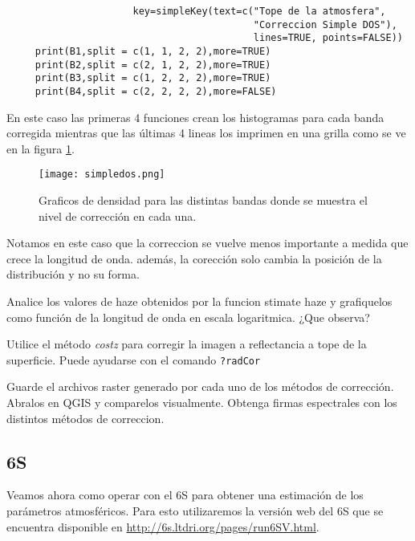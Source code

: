 \begin{exa}
\begin{lstlisting}
                      key=simpleKey(text=c("Tope de la atmosfera",
                                           "Correccion Simple DOS"),
                                           lines=TRUE, points=FALSE))
     print(B1,split = c(1, 1, 2, 2),more=TRUE)
     print(B2,split = c(2, 1, 2, 2),more=TRUE)
     print(B3,split = c(1, 2, 2, 2),more=TRUE)
     print(B4,split = c(2, 2, 2, 2),more=FALSE)
    \end{lstlisting}
    En este caso las primeras 4 funciones crean los histogramas para cada banda
    corregida mientras que las \'ultimas 4 lineas los imprimen en una grilla como
    se ve en la figura \ref{fig:simpledos}.
    \begin{figure}[h!]
    \begin{center}
        \texttt{[image: simpledos.png]}
    \end{center}
    \caption{Graficos de densidad para las distintas bandas donde se
        muestra el nivel de correcci\'on en cada una.}
    \label{fig:simpledos}
    \end{figure}
Notamos en este caso que la correccion se vuelve menos importante a medida
que crece la longitud de onda. adem\'as, la corecci\'on solo cambia la
posici\'on de la distribuci\'on y no su forma.

\end{exa}
\begin{act}
    Analice los valores de haze obtenidos por la funcion stimate haze y grafiquelos
    como funci\'on de la longitud de onda en escala logaritmica. ¿Que observa?
\end{act}

\begin{act}
    Utilice el m\'etodo \emph{costz} para corregir la imagen a reflectancia a tope
    de la superficie. Puede ayudarse con el comando \texttt{?radCor}
\end{act}

\begin{act}
    Guarde el archivos raster generado por cada uno de los m\'etodos de
    correcci\'on. Abralos en QGIS y comparelos visualmente. Obtenga firmas
    espectrales con los distintos m\'etodos de correccion.
\end{act}


\subsection{6S}
\label{sub:corr:6S}

Veamos ahora como operar con el 6S para obtener una estimaci\'on de los par\'ametros
atmosf\'ericos. Para esto utilizaremos la versi\'on web del 6S que se encuentra
disponible en \url{http://6s.ltdri.org/pages/run6SV.html}.

